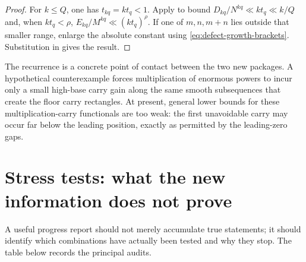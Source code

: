 \documentclass[11pt]{article}
\theoremstyle{definition}
\theoremstyle{remark}
\begin{document}
\begin{proof}
For $k\le Q$, one has $t_{kq}=kt_q<1$.  Apply
 to bound
$D_{kq}/N^{kq}\ll kt_q\ll k/Q$ and, when $kt_q<\rho$,
$E_{kq}/M^{kq}\ll(kt_q)^\rho$.  If one of $m,n,m+n$ lies outside that smaller
range, enlarge the absolute constant using \eqref{eq:defect-growth-brackets}.
Substitution in  gives the result.
\end{proof}

The recurrence is a concrete point of contact between the two new packages.  A
hypothetical counterexample forces multiplication of enormous powers to incur only a
small high-base carry gain along the same smooth subsequences that create the floor
carry rectangles.  At present, general lower bounds for these multiplication-carry
functionals are too weak: the first unavoidable carry may occur far below the leading
position, exactly as permitted by the leading-zero gaps.

\section{Stress tests: what the new information does not prove}
\label{sec:stress-tests}

A useful progress report should not merely accumulate true statements; it should
identify which combinations have actually been tested and why they stop.  The table
below records the principal audits.
\end{document}
